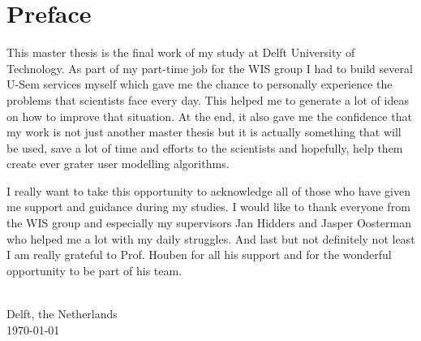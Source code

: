 
\chapter{\label{cha:Preface}Preface}

This master thesis is the final work of my study at Delft University of Technology. As part of my part-time job for the WIS group I had to  build several U-Sem services myself which gave me the chance to personally experience the problems that scientists face every day. This helped me to generate a lot of ideas on how to improve that situation. At the end, it also gave me the confidence that my work is not just  another master thesis but it is actually something that will be used, save a lot of time and efforts to the scientists and hopefully, help them create ever grater user modelling algorithms.

I really want to take this opportunity to acknowledge all of those who have given me support and guidance during my studies. I would like to thank everyone from the WIS group and especially my supervisors Jan Hidders and Jasper Oosterman who helped me a lot with my daily struggles. And last but not definitely not least I am really grateful to Prof. Houben for all his support and for the wonderful opportunity to be part of his team.


\vskip1cm 

\begin{flushright}
\theauthor\\
 Delft, the Netherlands \\
 \today\\
 
\par\end{flushright}
